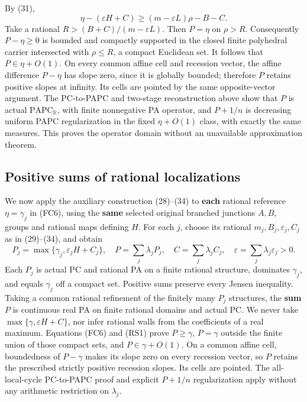 \documentclass[
  11pt,
]{article}
\begin{document}
By (31), \[
 \eta-(\varepsilon H+C)\geq(m-\varepsilon L)\rho-B-C.
\] Take a rational \(R>(B+C)/(m-\varepsilon L)\). Then \(P=\eta\) on
\(\rho>R\). Consequently \(P-\eta\geq0\) is bounded and compactly
supported in the closed finite polyhedral carrier intersected with
\(\rho\leq R\), a compact Euclidean set. It follows that
\(P\in\eta+O(1)\). On every common affine cell and recession vector, the
affine difference \(P-\eta\) has slope zero, since it is globally
bounded; therefore \(P\) retains positive slopes at infinity. Its cells
are pointed by the same opposite-vector argument. The PC-to-PAPC and
two-stage reconstruction above show that \(P\) is actual
\(\mathrm{PAPC}_{\mathbb{R}}\), with finite nonnegative PA operator, and
\(P+1/n\) is decreasing uniform PAPC regularization in the fixed
\(\eta+O(1)\) class, with exactly the same measures. This proves the
operator domain without an unavailable approximation theorem.

\subsection{Positive sums of rational
localizations}\label{positive-sums-of-rational-localizations}

We now apply the auxiliary construction (28)--(34) to \textbf{each}
rational reference \(\eta=\gamma_j\) in (FC6), using the \textbf{same}
selected original branched junctions \(A,B\), groups and rational maps
defining \(H\). For each \(j\), choose its rational
\(m_j,B_j,\varepsilon_j,C_j\) as in (29)--(34), and obtain \[
 P_j=\max\{\gamma_j,\varepsilon_j H+C_j\},\quad
 P=\sum_j\lambda_jP_j,\quad
 C=\sum_j\lambda_jC_j,\quad
 \varepsilon=\sum_j\lambda_j\varepsilon_j>0.                \tag{RS1}
\] Each \(P_j\) is actual PC and rational PA on a finite rational
structure, dominates \(\gamma_j\), and equals \(\gamma_j\) off a compact
set. Positive sums preserve every Jensen inequality. Taking a common
rational refinement of the finitely many \(P_j\) structures, the
\textbf{sum} \(P\) is continuous real PA on finite rational domains and
actual PC. We never take \(\max\{\gamma,\varepsilon H+C\}\), nor infer
rational walls from the coefficients of a real maximum. Equations (FC6)
and (RS1) prove \(P\geq\gamma\), \(P=\gamma\) outside the finite union
of those compact sets, and \(P\in\gamma+O(1)\). On a common affine cell,
boundedness of \(P-\gamma\) makes its slope zero on every recession
vector, so \(P\) retains the prescribed strictly positive recession
slopes. Its cells are pointed. The all-local-cycle PC-to-PAPC proof and
explicit \(P+1/n\) regularization apply without any arithmetic
restriction on \(\lambda_j\).
\end{document}
